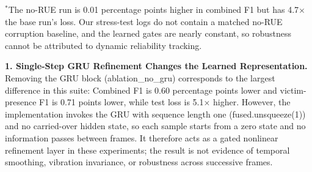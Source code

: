 \documentclass[journal]{IEEEtran}
\begin{document}
\begin{table}[!t]
\centering
\caption[Component ablations of AdapFuse-v1]{Component ablations of AdapFuse-v1 ($n=10{,}951$). Single runs; no repeated seeds or confidence intervals.}
\label{tab:ablation_results}
\footnotesize{$^*$The no-RUE run is 0.01 percentage points higher in combined F1 but has 4.7$\times$ the base run's loss. Our stress-test logs do not contain a matched no-RUE corruption baseline, and the learned gates are nearly constant, so robustness cannot be attributed to dynamic reliability tracking.}
\end{table}

\textbf{1. Single-Step GRU Refinement Changes the Learned Representation.}
Removing the GRU block (ablation\_no\_gru) corresponds to the largest difference in this suite: Combined F1 is 0.60 percentage points lower and victim-presence F1 is 0.71 points lower, while test loss is 5.1$\times$ higher. However, the implementation invokes the GRU with sequence length one (fused.unsqueeze(1)) and no carried-over hidden state, so each sample starts from a zero state and no information passes between frames. It therefore acts as a gated nonlinear refinement layer in these experiments; the result is not evidence of temporal smoothing, vibration invariance, or robustness across successive frames.
\end{document}
